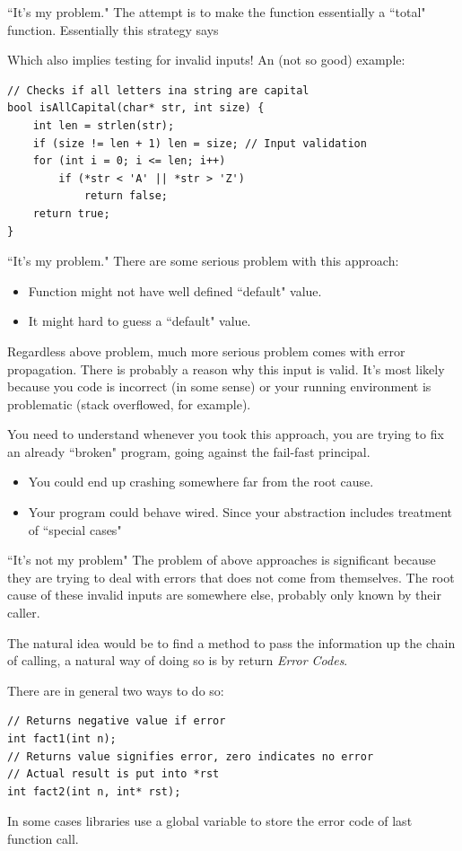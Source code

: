 \begin{frame}[fragile]{``It's my problem."}
The attempt is to make the function essentially a ``total" function. Essentially this strategy says 
\begin{center}
\end{center}
Which also implies testing for invalid inputs! An (not so good) example:
\begin{verbatim}
// Checks if all letters ina string are capital
bool isAllCapital(char* str, int size) {
    int len = strlen(str);
    if (size != len + 1) len = size; // Input validation
    for (int i = 0; i <= len; i++) 
        if (*str < 'A' || *str > 'Z')
            return false;
    return true;
}
\end{verbatim}
\end{frame}

\begin{frame}{``It's my problem."}
There are some serious problem with this approach:
\begin{itemize}
	\item Function might not have well defined ``default" value. 
	\item It might hard to guess a ``default" value. 
\end{itemize}
Regardless above problem, much more serious problem comes with error propagation. There is probably a reason why this input is valid. It's most likely because you code is incorrect (in some sense) or your running environment is problematic (stack overflowed, for example).

You need to understand whenever you took this approach, you are trying to fix an already ``broken" program, going against the fail-fast principal.

\begin{itemize}
	\item You could end up crashing somewhere far from the root cause.
	\item Your program could behave wired. Since your abstraction includes treatment of ``special cases"
\end{itemize}
\end{frame}

\begin{frame}[fragile]{``It's not my problem"}
The problem of above approaches is significant because they are trying to deal with errors that does not come from themselves. The root cause of these invalid inputs are somewhere else, probably only known by their caller. 

The natural idea would be to find a method to pass the information up the chain of calling, a natural way of doing so is by return \textit{Error Codes}.

There are in general two ways to do so:
\begin{verbatim}
// Returns negative value if error
int fact1(int n);
// Returns value signifies error, zero indicates no error
// Actual result is put into *rst 
int fact2(int n, int* rst);
\end{verbatim}
In some cases libraries use a global variable to store the error code of last function call.
\end{frame}

